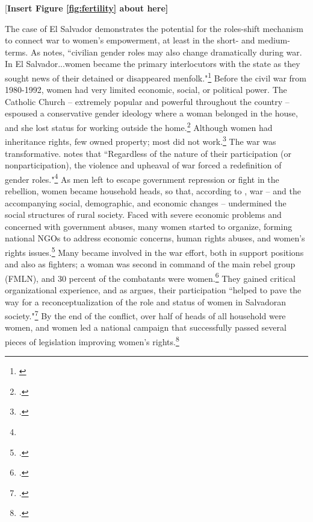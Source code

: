 \documentclass [12pt] {article}
\begin{document}
\begin{center}
[\bf Insert Figure \ref{fig:fertility} about here]
\end{center}
\vspace*{.2in}


The case of El Salvador demonstrates the potential for the roles-shift mechanism to connect war to women's empowerment, at least in the short- and medium-terms. As \citeauthor{wood2008social} notes, ``civilian gender roles may also change dramatically during war. In El Salvador...women became the primary interlocutors with the state as they sought news of their detained or disappeared menfolk."\footnote{\citealt[553]{wood2008social}} Before the civil war from 1980-1992, women had very limited economic, social, or political power. The Catholic Church -- extremely popular and powerful throughout the country -- espoused a conservative gender ideology where a woman belonged in the house, and she lost status for working outside the home.\footnote{.} Although women had inheritance rights, few owned property; most did not work.\footnote{.} The war was transformative. \citeauthor{viterna2013women} notes that ``Regardless of the nature of their participation (or nonparticipation), the violence and upheaval of war forced a redefinition of gender roles."\footnote{} As men left to escape government repression or fight in the rebellion, women became household heads, so that, according to \citeauthor{mason1992women}, war -- and the accompanying social, demographic, and economic changes -- undermined the social structures of rural society. Faced with severe economic problems and concerned with government abuses, many women started to organize, forming national NGOs to address economic concerns, human rights abuses, and women's rights issues.\footnote{.} Many became involved in the war effort, both in support positions and also as fighters; a woman was second in command of the main rebel group (FMLN), and 30 percent of the combatants were women.\footnote{.} They gained critical organizational experience, and as \citeauthor{shayne1999gendered} argues, their participation ``helped to pave the way for a reconceptualization of the role and status of women in Salvadoran society."\footnote{.} By the end of the conflict, over half of heads of all household were women, and women led a national campaign that successfully passed several pieces of legislation improving women's rights.\footnote{.}\\ 
\end{document}
